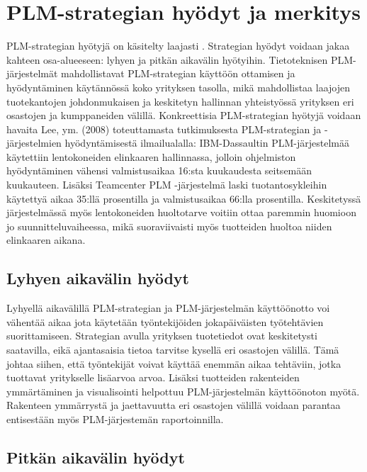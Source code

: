 \section{PLM-strategian hyödyt ja merkitys} \label{PLM strategian hyödyt}

PLM-strategian hyötyjä on käsitelty laajasti  \cite{alemanni_key_2008}  \cite{rivest_product_2012}. Strategian hyödyt voidaan jakaa kahteen osa-alueeseen: lyhyen ja pitkän aikavälin hyötyihin. Tietoteknisen PLM-järjestelmät mahdollistavat PLM-strategian käyttöön ottamisen ja hyödyntäminen käytännössä koko yrityksen tasolla, mikä mahdollistaa laajojen tuotekantojen johdonmukaisen ja keskitetyn hallinnan yhteistyössä yrityksen eri osastojen ja kumppaneiden välillä.
Konkreettisia PLM-strategian hyötyjä voidaan havaita Lee, ym. (2008) toteuttamasta tutkimuksesta PLM-strategian ja -järjestelmien hyödyntämisestä ilmailualalla: IBM-Dassaultin PLM-järjestelmää käytettiin lentokoneiden elinkaaren hallinnassa, jolloin ohjelmiston hyödyntäminen vähensi valmistusaikaa 16:sta kuukaudesta seitsemään kuukauteen. Lisäksi Teamcenter PLM -järjestelmä laski tuotantosykleihin käytettyä aikaa 35:llä prosentilla ja valmistusaikaa 66:lla prosentilla. Keskitetyssä järjestelmässä myös lentokoneiden huoltotarve voitiin ottaa paremmin huomioon jo suunnitteluvaiheessa, mikä suoraviivaisti myös tuotteiden huoltoa niiden elinkaaren aikana.  \cite{lee_product_2008}

\subsection{Lyhyen aikavälin hyödyt} \label{Lyhyen aikavälin hyödyt}

Lyhyellä aikavälillä PLM-strategian ja PLM-järjestelmän käyttöönotto voi vähentää aikaa jota käytetään työntekijöiden jokapäiväisten työtehtävien suorittamiseen. Strategian avulla yrityksen tuotetiedot ovat keskitetysti saatavilla, eikä ajantasaisia tietoa tarvitse kysellä eri osastojen välillä. Tämä johtaa siihen, että työntekijät voivat käyttää enemmän aikaa tehtäviin, jotka tuottavat yritykselle lisäarvoa arvoa. Lisäksi tuotteiden rakenteiden ymmärtäminen ja visualisointi helpottuu PLM-järjestelmän käyttöönoton myötä. Rakenteen ymmärrystä ja jaettavuutta eri osastojen välillä voidaan parantaa entisestään myös PLM-järjestemän raportoinnilla.  \cite{alemanni_key_2008}

\subsection{Pitkän aikavälin hyödyt} \label{Pitkän aikavälin hyödyt}

